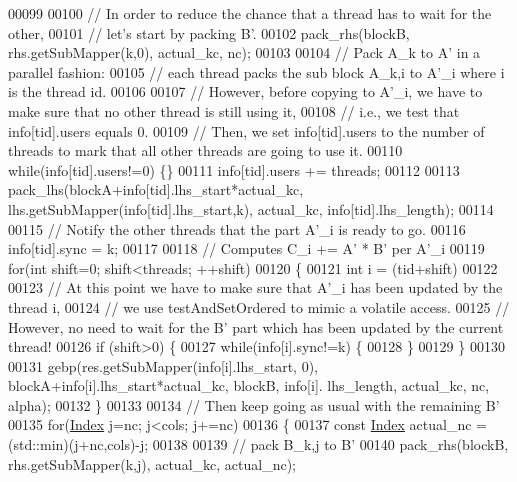 \begin{DoxyCode}
00099 
00100       \textcolor{comment}{// In order to reduce the chance that a thread has to wait for the other,}
00101       \textcolor{comment}{// let's start by packing B'.}
00102       pack\_rhs(blockB, rhs.getSubMapper(k,0), actual\_kc, nc);
00103 
00104       \textcolor{comment}{// Pack A\_k to A' in a parallel fashion:}
00105       \textcolor{comment}{// each thread packs the sub block A\_k,i to A'\_i where i is the thread id.}
00106 
00107       \textcolor{comment}{// However, before copying to A'\_i, we have to make sure that no other thread is still using it,}
00108       \textcolor{comment}{// i.e., we test that info[tid].users equals 0.}
00109       \textcolor{comment}{// Then, we set info[tid].users to the number of threads to mark that all other threads are going to
       use it.}
00110       \textcolor{keywordflow}{while}(info[tid].users!=0) \{\}
00111       info[tid].users += threads;
00112 
00113       pack\_lhs(blockA+info[tid].lhs\_start*actual\_kc, lhs.getSubMapper(info[tid].lhs\_start,k), actual\_kc, 
      info[tid].lhs\_length);
00114 
00115       \textcolor{comment}{// Notify the other threads that the part A'\_i is ready to go.}
00116       info[tid].sync = k;
00117 
00118       \textcolor{comment}{// Computes C\_i += A' * B' per A'\_i}
00119       \textcolor{keywordflow}{for}(\textcolor{keywordtype}{int} shift=0; shift<threads; ++shift)
00120       \{
00121         \textcolor{keywordtype}{int} i = (tid+shift)%
00122 
00123         \textcolor{comment}{// At this point we have to make sure that A'\_i has been updated by the thread i,}
00124         \textcolor{comment}{// we use testAndSetOrdered to mimic a volatile access.}
00125         \textcolor{comment}{// However, no need to wait for the B' part which has been updated by the current thread!}
00126         \textcolor{keywordflow}{if} (shift>0) \{
00127           \textcolor{keywordflow}{while}(info[i].sync!=k) \{
00128           \}
00129         \}
00130 
00131         gebp(res.getSubMapper(info[i].lhs\_start, 0), blockA+info[i].lhs\_start*actual\_kc, blockB, info[i].
      lhs\_length, actual\_kc, nc, alpha);
00132       \}
00133 
00134       \textcolor{comment}{// Then keep going as usual with the remaining B'}
00135       \textcolor{keywordflow}{for}(\hyperlink{namespace_eigen_a62e77e0933482dafde8fe197d9a2cfde}{Index} j=nc; j<cols; j+=nc)
00136       \{
00137         \textcolor{keyword}{const} \hyperlink{namespace_eigen_a62e77e0933482dafde8fe197d9a2cfde}{Index} actual\_nc = (std::min)(j+nc,cols)-j;
00138 
00139         \textcolor{comment}{// pack B\_k,j to B'}
00140         pack\_rhs(blockB, rhs.getSubMapper(k,j), actual\_kc, actual\_nc);

\end{DoxyCode}
